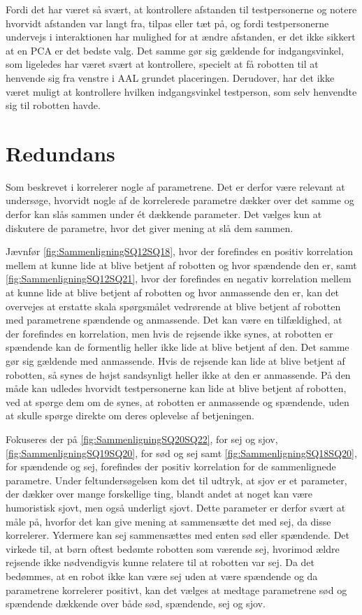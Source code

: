 Fordi det har været så svært, at kontrollere afstanden til testpersonerne og notere hvorvidt afstanden var langt fra, tilpas eller tæt på, og fordi testpersonerne undervejs i interaktionen har mulighed for at ændre afstanden, er det ikke sikkert at en PCA er det bedste valg. Det samme gør sig gældende for indgangsvinkel, som ligeledes har været svært at kontrollere, specielt at få robotten til at henvende sig fra venstre i AAL grundet placeringen. Derudover, har det ikke været muligt at kontrollere hvilken indgangsvinkel testperson, som selv henvendte sig til robotten havde. 


\section{Redundans}
\label{DiskussionRedundansSkalaer}
%
Som beskrevet i  korrelerer nogle af parametrene. Det er derfor være relevant at undersøge, hvorvidt nogle af de korrelerede parametre dækker over det samme og derfor kan slås sammen under ét dækkende parameter. Det vælges kun at diskutere de parametre, hvor det giver mening at slå dem sammen. 

Jævnfør \autoref{fig:SammenligningSQ12SQ18}, hvor der forefindes en positiv korrelation mellem at kunne lide at blive betjent af robotten og hvor spændende den er, samt \autoref{fig:SammenligningSQ12SQ21}, hvor der forefindes en negativ korrelation mellem at kunne lide at blive betjent af robotten og hvor anmassende den er, kan det overvejes at erstatte skala spørgsmålet vedrørende at blive betjent af robotten med parametrene spændende og anmassende. Det kan være en tilfældighed, at der forefindes en korrelation, men hvis de rejsende ikke synes, at robotten er spændende kan de formentlig heller ikke lide at blive betjent af den. Det samme gør sig gældende med anmassende. Hvis de rejsende kan lide at blive betjent af robotten, så synes de højst sandsynligt heller ikke at den er anmassende. På den måde kan udledes hvorvidt testpersonerne kan lide at blive betjent af robotten, ved at spørge dem om de synes, at robotten er anmassende og spændende, uden at skulle spørge direkte om deres oplevelse af betjeningen.

Fokuseres der på \autoref{fig:SammenligningSQ20SQ22}, for sej og sjov, \autoref{fig:SammenligningSQ19SQ20}, for sød og sej samt \autoref{fig:SammenligningSQ18SQ20}, for spændende og sej, forefindes der positiv korrelation for de sammenlignede parametre. Under feltundersøgelsen kom det til udtryk, at sjov er et parameter, der dækker over mange forskellige ting, blandt andet at noget kan være humoristisk sjovt, men også underligt sjovt. Dette parameter er derfor svært at måle på, hvorfor det kan give mening at sammensætte det med sej, da disse korrelerer. Ydermere kan sej sammensættes med enten sød eller spændende. Det virkede til, at børn oftest bedømte robotten som værende sej, hvorimod ældre rejsende ikke nødvendigvis kunne relatere til at robotten var sej. Da det bedømmes, at en robot ikke kan være sej uden at være spændende og da parametrene korrelerer positivt, kan det vælges at medtage parametrene sød og spændende dækkende over både sød, spændende, sej og sjov.  

